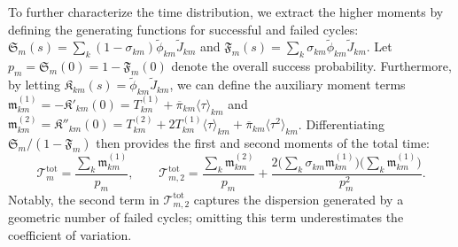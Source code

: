 \documentclass[pdflatex,sn-mathphys-num]{sn-jnl}
\numberwithin{equation}{section}
\theoremstyle{thmstyleone}%
\theoremstyle{definition}
\theoremstyle{remark}
\begin{document}
To further characterize the time distribution, we extract the higher moments by defining the generating functions for successful and failed cycles: $\mathfrak S_m(s)=\sum_k(1-\sigma_{km})\widetilde\phi_{km}\widetilde J_{km}$ and $\mathfrak F_m(s)=\sum_k\sigma_{km}\widetilde\phi_{km}\widetilde J_{km}$. Let $p_m=\mathfrak S_m(0)=1-\mathfrak F_m(0)$ denote the overall success probability. Furthermore, by letting $\mathfrak K_{km}(s)=\widetilde\phi_{km}\widetilde J_{km}$, we can define the auxiliary moment terms $\mathfrak m^{(1)}_{km}=-\mathfrak K'_{km}(0)=T^{(1)}_{km}+\overline\pi_{km}\langle\tau\rangle_{km}$ and $\mathfrak m^{(2)}_{km}=\mathfrak K''_{km}(0)=T^{(2)}_{km}+2T^{(1)}_{km}\langle\tau\rangle_{km}+\overline\pi_{km}\langle\tau^2\rangle_{km}$. Differentiating $\mathfrak S_m/(1-\mathfrak F_m)$ then provides the first and second moments of the total time:
\begin{equation}
\mathcal T^{\mathrm{tot}}_m=\frac{\sum_k\mathfrak m^{(1)}_{km}}{p_m},
\qquad
\mathcal T^{\mathrm{tot}}_{m,2}=\frac{\sum_k\mathfrak m^{(2)}_{km}}{p_m}
+\frac{2\bigl(\sum_k\sigma_{km}\mathfrak m^{(1)}_{km}\bigr)
\bigl(\sum_k\mathfrak m^{(1)}_{km}\bigr)}{p_m^2}.
\label{eq:moments}
\end{equation}
Notably, the second term in $\mathcal T^{\mathrm{tot}}_{m,2}$ captures the dispersion generated by a geometric number of failed cycles; omitting this term underestimates the coefficient of variation.
\end{document}
